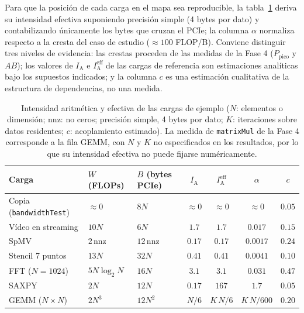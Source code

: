 \documentclass[a4paper,11pt]{article}
\begin{document}
Para que la posición de cada carga en el mapa sea reproducible, la tabla~\ref{tab:intensidades} deriva su intensidad efectiva
suponiendo precisión simple (4 bytes por dato) y contabilizando únicamente los bytes que cruzan el PCIe; la columna $\alpha$
normaliza respecto a la cresta del caso de estudio ($\approx 100$ FLOP/B). Conviene distinguir tres niveles de evidencia:
las crestas proceden de las medidas de la Fase 4 ($P_{\text{pico}}$ y $AB$); los valores de $I_{\text{A}}$ e
$I_{\text{A}}^{\text{eff}}$ de las cargas de referencia son estimaciones analíticas bajo los supuestos indicados; y la
columna $c$ es una estimación cualitativa de la estructura de dependencias, no una medida.

\begin{table}[t]
\centering
\footnotesize
\caption{Intensidad aritmética y efectiva de las cargas de ejemplo ($N$: elementos o dimensión; nnz: no ceros; precisión
simple, 4 bytes por dato; $K$: iteraciones sobre datos residentes; $c$: acoplamiento estimado). La medida de
\texttt{matrixMul} de la Fase 4 corresponde a la fila GEMM, con $N$ y $K$ no especificados en los resultados, por lo que su
intensidad efectiva no puede fijarse numéricamente.}
\label{tab:intensidades}
\begin{tabular}{>{\raggedright\arraybackslash}p{2.7cm} >{\raggedright\arraybackslash}p{2.5cm} >{\raggedright\arraybackslash}p{2.5cm} c c c c}
\toprule
\textbf{Carga} & \textbf{$W$ (FLOPs)} & \textbf{$B$ (bytes PCIe)} & \textbf{$I_{\text{A}}$} & \textbf{$I_{\text{A}}^{\text{eff}}$} & \textbf{$\alpha$} & \textbf{$c$} \\
\midrule
Copia (\texttt{bandwidthTest}) & $\approx 0$ & $8N$ & $\approx 0$ & $\approx 0$ & $\approx 0$ & $0.05$ \\
Vídeo en streaming & $10N$ & $6N$ & $1.7$ & $1.7$ & $0.017$ & $0.15$ \\
SpMV & $2\,\text{nnz}$ & $12\,\text{nnz}$ & $0.17$ & $0.17$ & $0.0017$ & $0.24$ \\
Stencil 7 puntos & $13N$ & $32N$ & $0.41$ & $0.41$ & $0.0041$ & $0.10$ \\
FFT ($N=1024$) & $5N\log_2 N$ & $16N$ & $3.1$ & $3.1$ & $0.031$ & $0.47$ \\
SAXPY & $2N$ & $12N$ & $0.17$ & $167$ & $1.7$ & $0.05$ \\
GEMM ($N\times N$) & $2N^3$ & $12N^2$ & $N/6$ & $K\,N/6$ & $K\,N/600$ & $0.20$ \\
\bottomrule
\end{tabular}
\end{table}
\end{document}
